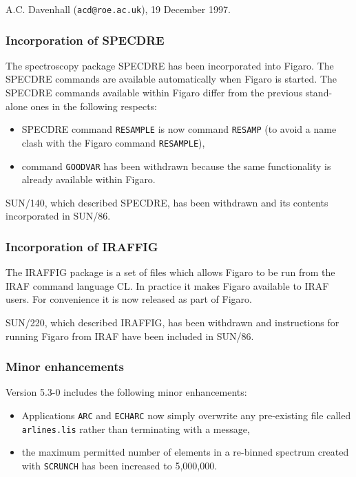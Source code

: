 \documentclass[11pt,twoside]{article}
\begin{document}
 A.C. Davenhall ({\tt acd@roe.ac.uk}), 19 December 1997.


\subsubsection{Incorporation of SPECDRE}

 The spectroscopy package SPECDRE has been incorporated into Figaro.  The
 SPECDRE commands are available automatically when Figaro is started.
 The SPECDRE commands available within Figaro differ from the previous
 stand-alone ones in the following respects:

\begin{itemize}

  \item SPECDRE command {\tt RESAMPLE} is now command {\tt RESAMP} (to
   avoid a name clash with the Figaro command {\tt RESAMPLE}),

  \item command {\tt GOODVAR} has been withdrawn because the same
   functionality is already available within Figaro.

\end{itemize}

 SUN/140, which described SPECDRE, has been withdrawn and its contents
 incorporated in SUN/86.

\subsubsection{Incorporation of IRAFFIG}

 The IRAFFIG package is a set of files which allows Figaro to be run
 from the IRAF command language CL.  In practice it makes Figaro
 available to IRAF users.  For convenience it is now released as part
 of Figaro.

 SUN/220, which described IRAFFIG, has been withdrawn and instructions for
 running Figaro from IRAF have been included in SUN/86.

\subsubsection{Minor enhancements}

 Version 5.3-0 includes the following minor enhancements:

\begin{itemize}

 \item Applications {\tt ARC} and {\tt ECHARC} now simply overwrite any
  pre-existing file called {\tt arlines.lis} rather than terminating with
  a message,

 \item the maximum permitted number of elements in a re-binned spectrum
  created with {\tt SCRUNCH} has been increased to 5,000,000.

\end{itemize}
\end{document}
